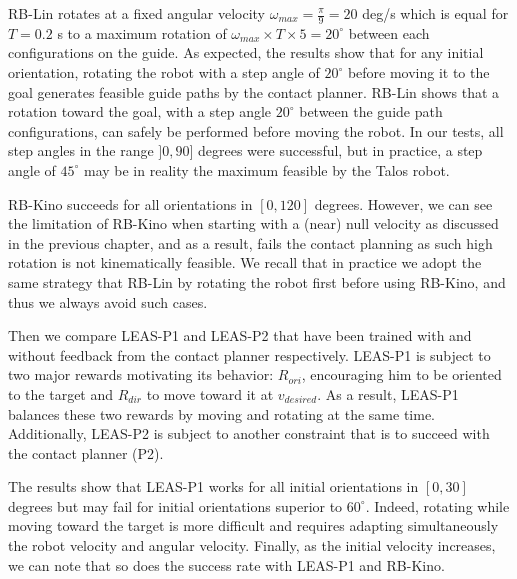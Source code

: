 RB-Lin rotates at a fixed angular velocity $\omega_{max}=\frac{\pi}{9}=20$ deg/s which is equal for $T=0.2$ s to a maximum rotation of $\omega_{max} \times T \times 5 = 20^{\circ}$ between each configurations on the guide.
As expected, the results show that for any initial orientation, rotating the robot with a step angle of $20^{\circ}$ before moving it to the goal generates feasible guide paths by the contact planner. 
RB-Lin shows that a rotation toward the goal, with a step angle $20^{\circ}$ between the guide path configurations, can safely be performed before moving the robot. 
In our tests, all step angles in the range $]0,90]$ degrees were successful, but in practice, a step angle of $45^{\circ}$ may be in reality the maximum feasible by the Talos robot.

RB-Kino succeeds for all orientations in $[0,120]$ degrees. 
However, we can see the limitation of RB-Kino when starting with a (near) null velocity as discussed in the previous chapter, and as a result, fails the contact planning as such high rotation is not kinematically feasible. 
We recall that in practice we adopt the same strategy that RB-Lin by rotating the robot first before using RB-Kino, and thus we always avoid such cases.

Then we compare LEAS-P1 and LEAS-P2 that have been trained with and without feedback from the contact planner respectively.
LEAS-P1 is subject to two major rewards motivating its behavior: $R_{ori}$, encouraging him to be oriented to the target and $R_{dir}$ to move toward it at $v_{desired}$. 
As a result, LEAS-P1 balances these two rewards by moving and rotating at the same time. 
Additionally, LEAS-P2 is subject to another constraint that is to succeed with the contact planner (P2).

The results show that LEAS-P1 works for all initial orientations in $[0,30]$ degrees but may fail for initial orientations superior to $60^{\circ}$.
Indeed, rotating while moving toward the target is more difficult and requires adapting simultaneously the robot velocity and angular velocity.
Finally, as the initial velocity increases, we can note that so does the success rate with LEAS-P1 and RB-Kino.

